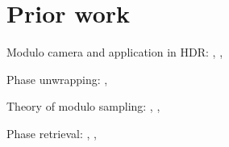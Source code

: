 \section{Prior work}
\label{sec:prior}

Modulo camera and application in HDR: \cite{ICCP15_Zhao}, \cite{Shah}, \cite{Lang2017}

Phase unwrapping: \cite{bioucas2007phase}, \cite{Hooper2007}

Theory of modulo sampling: \cite{Bhandari}, \cite{Cucuringu2017}, \cite{Cucuringu2018}

Phase retrieval: \cite{Netrapalli2013}, \cite{Jagatap2017}, 
